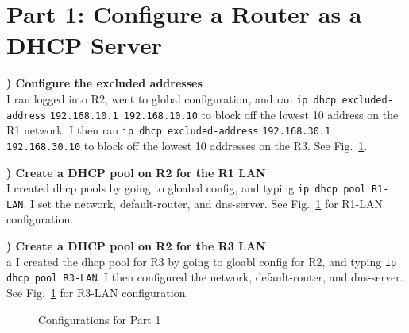 \documentclass{report}
\title{\classinfo}
\author{\semester}
\date{\today}
\newcommand{\mysection}[1]{\section*{#1}}
\newcommand{\mysubsection}[2]{\textbf{\romannumeral #1) #2}}
\begin{document}
\maketitle

\mysection{\textbf{Part 1: Configure a Router as a DHCP Server}}

\mysubsection{1}{Configure the excluded addresses}\\
I ran logged into R2, went to global configuration, and ran 
{\scriptsize{\verb$ip dhcp excluded-address$}} 
{\scriptsize{\verb$192.168.10.1 192.168.10.10$}\normalsize} 
to block off the lowest 10 address on the R1 network. I then ran 
{\scriptsize{\verb$ip dhcp excluded-address$}\normalsize} 
{\scriptsize{\verb$192.168.30.1 192.168.30.10$}\normalsize} 
to block off the lowest 10 addresses on the R3. See
Fig.~\ref{P1Config19}.


\noindent\mysubsection{2}{Create a DHCP pool on R2 for the R1 LAN}\\
I created dhcp pools by going to gloabal config, and typing
{\scriptsize{\verb$ip dhcp pool R1-LAN$}\normalsize}. 
I set the network, default-router, and dns-server.
See Fig.~\ref{P1Config19} for R1-LAN configuration.

\noindent\mysubsection{3}{Create a DHCP pool on R2 for the R3 LAN}\\
a
I created the dhcp pool for R3 by going to gloabl config for R2, and typing
{\scriptsize{\verb$ip dhcp pool R3-LAN$}\normalsize}. I then configured the
network, default-router, and dns-server.
See Fig.~\ref{P1Config19} for R3-LAN configuration.


\begin{figure}[!hbt]\centering
{}\par
{}\hfill
{}\par
\caption{Configurations for Part 1}\label{P1Config19}
\end{figure}
\end{document}
